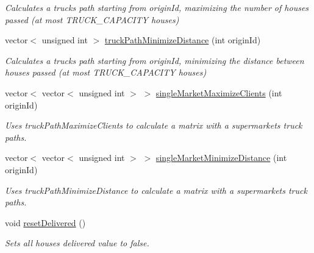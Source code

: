\begin{DoxyCompactItemize}
\begin{DoxyCompactList}\small\item\em Calculates a truck\textquotesingle{}s path starting from origin\+Id, maximizing the number of houses passed (at most T\+R\+U\+C\+K\+\_\+\+C\+A\+P\+A\+C\+I\+TY houses) \end{DoxyCompactList}\item 
vector$<$ unsigned int $>$ \hyperlink{class_market_delivery_system_ae49235884bbd0173f618b1e01ccb040a}{truck\+Path\+Minimize\+Distance} (int origin\+Id)
\begin{DoxyCompactList}\small\item\em Calculates a truck\textquotesingle{}s path starting from origin\+Id, minimizing the distance between houses passed (at most T\+R\+U\+C\+K\+\_\+\+C\+A\+P\+A\+C\+I\+TY houses) \end{DoxyCompactList}\item 
vector$<$ vector$<$ unsigned int $>$ $>$ \hyperlink{class_market_delivery_system_a982fd9065bf4ae600b1e430f7288fa5b}{single\+Market\+Maximize\+Clients} (int origin\+Id)
\begin{DoxyCompactList}\small\item\em Uses truck\+Path\+Maximize\+Clients to calculate a matrix with a supermarket\textquotesingle{}s truck paths. \end{DoxyCompactList}\item 
vector$<$ vector$<$ unsigned int $>$ $>$ \hyperlink{class_market_delivery_system_a6ed74e3fcb2365305853e3b937bfae7f}{single\+Market\+Minimize\+Distance} (int origin\+Id)
\begin{DoxyCompactList}\small\item\em Uses truck\+Path\+Minimize\+Distance to calculate a matrix with a supermarket\textquotesingle{}s truck paths. \end{DoxyCompactList}\item 
\hypertarget{class_market_delivery_system_a11ec2cbe280289802252bc959486c0b7}{}\label{class_market_delivery_system_a11ec2cbe280289802252bc959486c0b7} 
void \hyperlink{class_market_delivery_system_a11ec2cbe280289802252bc959486c0b7}{reset\+Delivered} ()
\begin{DoxyCompactList}\small\item\em Sets all house\textquotesingle{}s delivered value to false. \end{DoxyCompactList}\item 
\hypertarget{class_market_delivery_system_aa7d34d0e49383b926a7a85a2f4b20439}{}\label{class_market_delivery_system_aa7d34d0e49383b926a7a85a2f4b20439} 

\end{DoxyCompactItemize}
